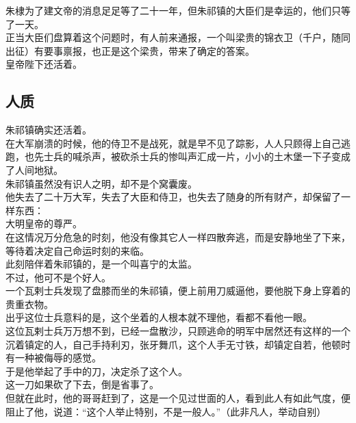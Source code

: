 \begin{multicols}{\theparacolNo}
朱棣为了建文帝的消息足足等了二十一年，但朱祁镇的大臣们是幸运的，他们只等了一天。\\

正当大臣们盘算着这个问题时，有人前来通报，一个叫梁贵的锦衣卫（千户，随同出征）有要事禀报，也正是这个梁贵，带来了确定的答案。\\

皇帝陛下还活着。\\

\subsection{人质}
朱祁镇确实还活着。\\

在大军崩溃的时候，他的侍卫不是战死，就是早不见了踪影，人人只顾得上自己逃跑，也先士兵的喊杀声，被砍杀士兵的惨叫声汇成一片，小小的土木堡一下子变成了人间地狱。\\

朱祁镇虽然没有识人之明，却不是个窝囊废。\\

他失去了二十万大军，失去了大臣和侍卫，也失去了随身的所有财产，却保留了一样东西：\\

大明皇帝的尊严。\\

在这情况万分危急的时刻，他没有像其它人一样四散奔逃，而是安静地坐了下来，等待着决定自己命运时刻的来临。\\

此刻陪伴着朱祁镇的，是一个叫喜宁的太监。\\

不过，他可不是个好人。\\

一个瓦剌士兵发现了盘膝而坐的朱祁镇，便上前用刀威逼他，要他脱下身上穿着的贵重衣物。\\

出乎这位士兵意料的是，这个坐着的人根本就不理他，看都不看他一眼。\\

这位瓦剌士兵万万想不到，已经一盘散沙，只顾逃命的明军中居然还有这样的一个沉着镇定的人，自己手持利刃，张牙舞爪，这个人手无寸铁，却镇定自若，他顿时有一种被侮辱的感觉。\\

于是他举起了手中的刀，决定杀了这个人。\\

这一刀如果砍了下去，倒是省事了。\\

但就在此时，他的哥哥赶到了，这是一个见过世面的人，看到此人有如此气度，便阻止了他，说道：“这个人举止特别，不是一般人。”（此非凡人，举动自别）\\


\end{multicols}
